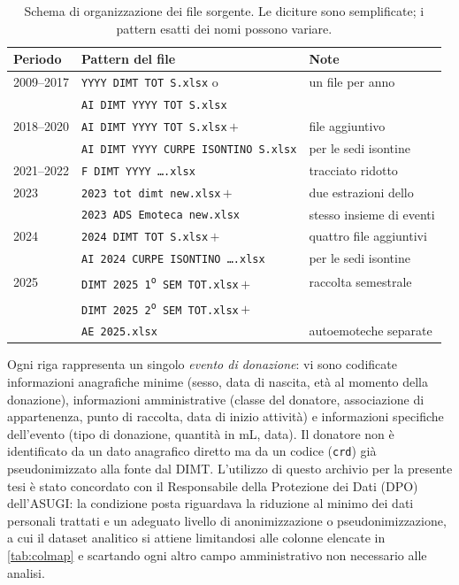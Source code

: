 \begin{table}[ht]
\centering
\caption{Schema di organizzazione dei file sorgente. Le diciture sono
semplificate; i pattern esatti dei nomi possono variare.}
\label{tab:files}
\small
\setlength{\tabcolsep}{4pt}
\begin{tabular}{@{}lll@{}}
\toprule
\textbf{Periodo} & \textbf{Pattern del file} & \textbf{Note} \\
\midrule
2009--2017 & \texttt{YYYY DIMT TOT S.xlsx} o          & un file per anno \\
           & \texttt{AI DIMT YYYY TOT S.xlsx}         &  \\
2018--2020 & \texttt{AI DIMT YYYY TOT S.xlsx}\,$+$    & file aggiuntivo \\
           & \texttt{AI DIMT YYYY CURPE ISONTINO S.xlsx} & per le sedi isontine \\
2021--2022 & \texttt{F DIMT YYYY \ldots.xlsx}         & tracciato ridotto \\
2023       & \texttt{2023 tot dimt new.xlsx}\,$+$     & due estrazioni dello \\
           & \texttt{2023 ADS Emoteca new.xlsx}       & stesso insieme di eventi \\
2024       & \texttt{2024 DIMT TOT S.xlsx}\,$+$       & quattro file aggiuntivi \\
           & \texttt{AI 2024 CURPE ISONTINO \ldots.xlsx} & per le sedi isontine \\
2025       & \texttt{DIMT 2025 1\textsuperscript{o}\,SEM TOT.xlsx}\,$+$ & raccolta semestrale \\
           & \texttt{DIMT 2025 2\textsuperscript{o}\,SEM TOT.xlsx}\,$+$ &  \\
           & \texttt{AE 2025.xlsx}                    & autoemoteche separate \\
\bottomrule
\end{tabular}
\end{table}

Ogni riga rappresenta un singolo \emph{evento di donazione}: vi sono codificate
informazioni anagrafiche minime (sesso, data di nascita, età al momento della
donazione), informazioni amministrative (classe del donatore, associazione di
appartenenza, punto di raccolta, data di inizio attività) e informazioni
specifiche dell'evento (tipo di donazione, quantità in mL, data). Il donatore
non è identificato da un dato anagrafico diretto ma da un codice (\texttt{crd})
già pseudonimizzato alla fonte dal DIMT. L'utilizzo di questo archivio per la
presente tesi è stato concordato con il Responsabile della Protezione dei Dati
(DPO) dell'ASUGI: la condizione posta riguardava la riduzione al minimo dei
dati personali trattati e un adeguato livello di anonimizzazione o
pseudonimizzazione, a cui il dataset analitico si attiene limitandosi alle
colonne elencate in \cref{tab:colmap} e scartando ogni altro campo
amministrativo non necessario alle analisi.

